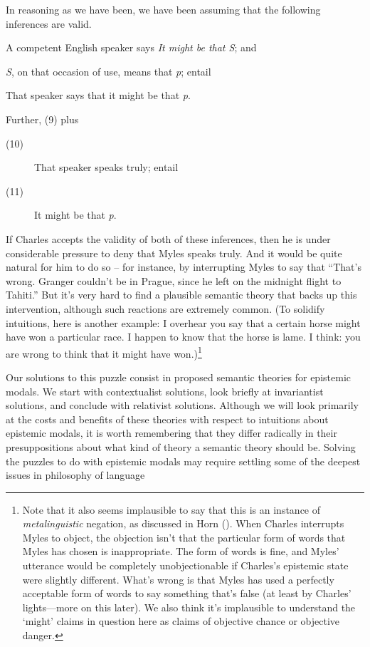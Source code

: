\documentclass[
  11pt,
  letterpaper,
  DIV=11,
  numbers=noendperiod]{scrartcl}
\providecommand{\tightlist}{%
  \setlength{\itemsep}{0pt}\setlength{\parskip}{0pt}}\usepackage{longtable,booktabs,array}
\begin{document}
In reasoning as we have been, we have been assuming that the following
inferences are valid.

\begin{description}
\tightlist
\item[(7)]
A competent English speaker says \emph{It might be that S}; and
\item[(8)]
\emph{S}, on that occasion of use, means that \emph{p}; entail
\item[(9)]
That speaker says that it might be that \emph{p}.
\end{description}

Further, (9) plus

\begin{description}
\item[(10)]
That speaker speaks truly; entail
\item[(11)]
It might be that \emph{p}.
\end{description}

If Charles accepts the validity of both of these inferences, then he is
under considerable pressure to deny that Myles speaks truly. And it
would be quite natural for him to do so -- for instance, by interrupting
Myles to say that ``That's wrong. Granger couldn't be in Prague, since
he left on the midnight flight to Tahiti.'' But it's very hard to find a
plausible semantic theory that backs up this intervention, although such
reactions are extremely common. (To solidify intuitions, here is another
example: I overhear you say that a certain horse might have won a
particular race. I happen to know that the horse is lame. I think: you
are wrong to think that it might have won.)\footnote{Note that it also
  seems implausible to say that this is an instance of
  \emph{metalinguistic} negation, as discussed in Horn
  (). When Charles interrupts Myles to
  object, the objection isn't that the particular form of words that
  Myles has chosen is inappropriate. The form of words is fine, and
  Myles' utterance would be completely unobjectionable if Charles's
  epistemic state were slightly different. What's wrong is that Myles
  has used a perfectly acceptable form of words to say something that's
  false (at least by Charles' lights---more on this later). We also
  think it's implausible to understand the `might' claims in question
  here as claims of objective chance or objective danger.}

Our solutions to this puzzle consist in proposed semantic theories for
epistemic modals. We start with contextualist solutions, look briefly at
invariantist solutions, and conclude with relativist solutions. Although
we will look primarily at the costs and benefits of these theories with
respect to intuitions about epistemic modals, it is worth remembering
that they differ radically in their presuppositions about what kind of
theory a semantic theory should be. Solving the puzzles to do with
epistemic modals may require settling some of the deepest issues in
philosophy of language
\end{document}
